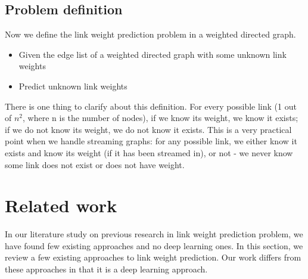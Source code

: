 \documentclass[letterpaper]{article}
\begin{document}
\subsection{Problem definition}
Now we define the link weight prediction problem in a weighted directed graph.
\begin{itemize}
	\item Given the edge list of a weighted directed graph with some unknown link weights
	\item Predict unknown link weights
\end{itemize}
There is one thing to clarify about this definition.
For every possible link (1 out of $ n^2 $, where n is the number of nodes), 
if we know its weight, we know it exists;
if we do not know its weight, we do not know it exists.
This is a very practical point when we handle streaming graphs:
for any possible link,
we either know it exists and know its weight (if it has been streamed in), or not - we never know some link does not exist or does not have weight.

\section{Related work}
In our literature study on previous research in link weight prediction problem,
we have found few existing approaches and no deep learning ones.
In this section,
we review a few existing approaches to link weight prediction.
Our work differs from these approaches in that it is a deep learning approach.
\end{document}
